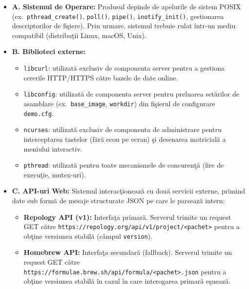 \documentclass[12pt, a4paper]{article}
\begin{document}
\begin{itemize}
    \item \textbf{A. Sistemul de Operare:} Produsul depinde de apelurile de sistem POSIX (ex.\
    \texttt{pthread\_create()}, \texttt{poll()}, \texttt{pipe()}, \texttt{inotify\_init()}, gestionarea
    descriptorilor de fi\c{s}iere). Prin urmare, sistemul trebuie rulat \^{i}ntr-un mediu compatibil
    (distribu\c{t}ii Linux, macOS, Unix).

    \item \textbf{B. Biblioteci externe:}
    \begin{itemize}
        \item \texttt{libcurl}: utilizat\u{a} exclusiv de componenta server pentru a gestiona cererile
        HTTP/HTTPS c\u{a}tre bazele de date online.
        \item \texttt{libconfig}: utilizat\u{a} de componenta server pentru preluarea set\u{a}rilor de
        asamblare (ex.\ \texttt{base\_image}, \texttt{workdir}) din fi\c{s}ierul de configurare \texttt{demo.cfg}.
        \item \texttt{ncurses}: utilizat\u{a} exclusiv de componenta de administrare pentru interceptarea
        tastelor (f\u{a}r\u{a} ecou pe ecran) \c{s}i desenarea matricial\u{a} a meniului interactiv.
        \item \texttt{pthread}: utilizat\u{a} pentru toate mecanismele de concuren\c{t}\u{a} (fire de execu\c{t}ie,
        mutex-uri).
    \end{itemize}

    \item \textbf{C. API-uri Web:} Sistemul interac\c{t}ioneaz\u{a} cu dou\u{a} servicii externe, primind date
    sub form\u{a} de mesaje structurate JSON pe care le parseaz\u{a} intern:
    \begin{itemize}
        \item \textbf{Repology API (v1):} Interfa\c{t}a primar\u{a}. Serverul trimite un request GET c\u{a}tre
        \texttt{https://repology.org/api/v1/project/<pachet>} pentru a ob\c{t}ine versiunea stabil\u{a}
        (câmpul \texttt{version}).
        \item \textbf{Homebrew API:} Interfa\c{t}a secundar\u{a} (fallback). Serverul trimite un request GET
        c\u{a}tre \texttt{https://formulae.brew.sh/api/formula/<pachet>.json} pentru a ob\c{t}ine versiunea
        stabil\u{a} \^{i}n cazul \^{i}n care interogarea primar\u{a} e\c{s}ueaz\u{a}.
    \end{itemize}
\end{itemize}
\end{document}
